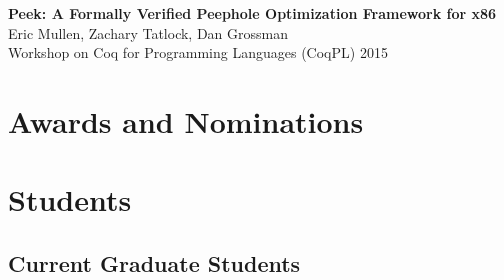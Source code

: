 \documentclass[10pt]{article}
\begin{document}
\textbf{%
Peek: A Formally Verified Peephole Optimization Framework for x86
} \\
Eric Mullen, Zachary Tatlock, Dan Grossman \\
Workshop on Coq for Programming Languages (CoqPL) 2015 \\



\section*{Awards and Nominations}

\section*{Students}

\subsection*{Current Graduate Students}
\end{document}

